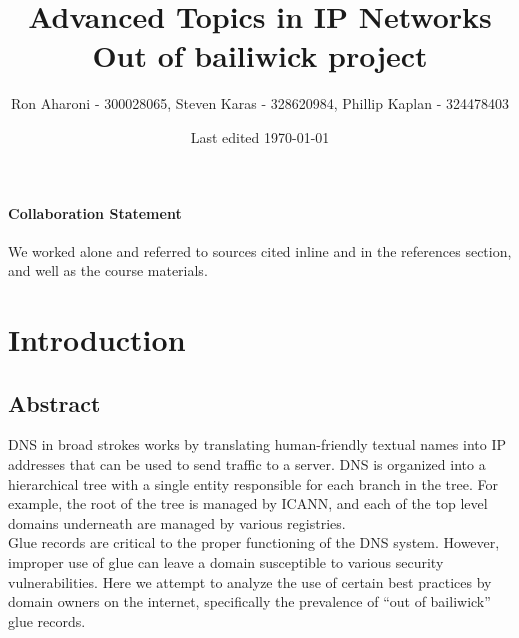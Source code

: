 \documentclass{idc_msc}
\title{Advanced Topics in IP Networks \\\large Out of bailiwick project}
\date{Last edited \today}
\author{Ron Aharoni\texorpdfstring{ - 300028065}{}, Steven Karas\texorpdfstring{ - 328620984}{}, Phillip Kaplan\texorpdfstring{ - 324478403}{}}
\begin{document}
\paragraph{Collaboration Statement}
  We worked alone and referred to sources cited inline and in the references section, and well as the course materials.


\section{Introduction}

\subsection{Abstract}
DNS in broad strokes works by translating human-friendly textual names into IP addresses that can be used to send traffic to a server.
DNS is organized into a hierarchical tree with a single entity responsible for each branch in the tree.
For example, the root of the tree is managed by ICANN, and each of the top level domains underneath are managed by various registries.\\
Glue records are critical to the proper functioning of the DNS system\cite{rfc1033}. However, improper use of glue can leave a domain susceptible to various security vulnerabilities. Here we attempt to analyze the use of certain best practices by domain owners on the internet, specifically the prevalence of “out of bailiwick” glue records.
\end{document}
